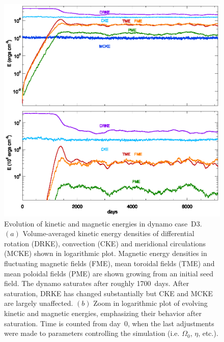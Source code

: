 \begin{figure}[htbp]
  \begin{center}
    \includegraphics[width=0.85\linewidth]{figs/chapter_2/apj_energy_trace_mmc_vturf_3.eps}
  \end{center}
  \caption[Evolution of kinetic and magnetic energies in dynamo case~D3]
	  {Evolution of kinetic and magnetic energies in dynamo case~D3. 
	    $(a)$ Volume-averaged kinetic energy densities of differential
	  rotation (DRKE), convection (CKE) and meridional
	  circulations (MCKE) shown in logarithmic plot.  Magnetic
	  energy densities in fluctuating magnetic fields (FME), mean
	  toroidal fields (TME) and mean poloidal fields (PME) are
	  shown growing from an initial seed field.  The dynamo
	  saturates after roughly 1700~days.  After saturation, DRKE
	  has changed substantially but CKE and MCKE are largely unaffected.
	  $(b)$ Zoom in logarithmic plot of evolving kinetic and
	  magnetic energies, emphasizing their behavior after
	  saturation.
	  Time is counted from day~0, when the last adjustments were
	  made to parameters controlling the simulation
	  (i.e. $\Omega_0$, $\eta$, etc.).
  \label{fig:energy_D3}}
\end{figure}



